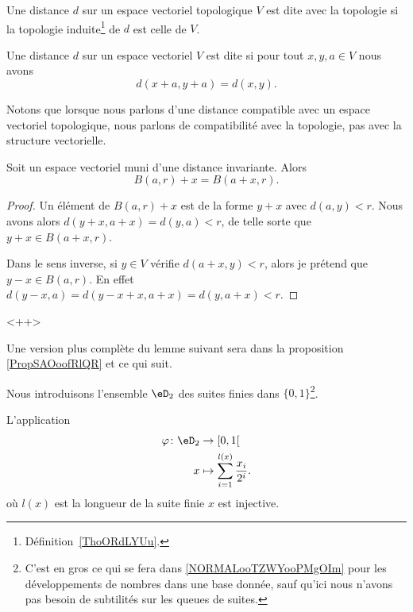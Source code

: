\begin{definition}      \label{DEFooGTOZooRcvGHg}
	Une distance \( d\) sur un espace vectoriel topologique \( V\) est dite  avec la topologie si la topologie induite\footnote{Définition~\ref{ThoORdLYUu}.} de \( d\) est celle de \( V\).
\end{definition}

\begin{definition}      \label{DEFooEUXVooEBYhNU}
	Une distance \( d\) sur un espace vectoriel \( V\) est dite  si pour tout \( x,y,a\in V\) nous avons
	\begin{equation}
		d(x+a,y+a)=d(x,y).
	\end{equation}
\end{definition}
Notons que lorsque nous parlons d'une distance compatible avec un espace vectoriel topologique, nous parlons de compatibilité avec la topologie, pas avec la structure vectorielle.

\begin{lemma}        \label{LEMooZNBAooOhEwJd}
	Soit un espace vectoriel muni d'une distance invariante. Alors
	\begin{equation}
		B(a,r)+x=B(a+x,r).
	\end{equation}
\end{lemma}

\begin{proof}
	Un élément de \( B(a,r)+x\) est de la forme \( y+x\) avec \( d(a,y)<r\). Nous avons alors \( d(y+x,a+x)=d(y,a)<r\), de telle sorte que \( y+x\in B(a+x,r)\).

	Dans le sens inverse, si \( y\in V\) vérifie \( d(a+x,y)<r\), alors je prétend que \( y-x\in B(a,r)\). En effet \( d(y-x,a)=d(y-x+x,a+x)=d(y,a+x)<r\).
\end{proof}
<++>

Une version plus complète du lemme suivant sera dans la proposition \ref{PropSAOoofRlQR} et ce qui suit.
\begin{lemma}      \label{LEMooIQBXooUEtdoy}
	Nous introduisons l'ensemble \( \eD_2\) des suites finies dans \( \{ 0,1 \}\)\footnote{C'est en gros ce qui se fera dans \ref{NORMALooTZWYooPMgOIm} pour les développements de nombres dans une base donnée, sauf qu'ici nous n'avons pas besoin de subtilités sur les queues de suites.}.

	L'application
	\begin{equation}
		\begin{aligned}
			\varphi\colon \eD_2 & \to \mathopen[ 0 , 1 \mathclose[              \\
			x                   & \mapsto \sum_{i=1}^{l(x)}\frac{ x_i }{ 2^i }.
		\end{aligned}
	\end{equation}
	où \( l(x)\) est la longueur de la suite finie \( x\) est injective.
\end{lemma}

